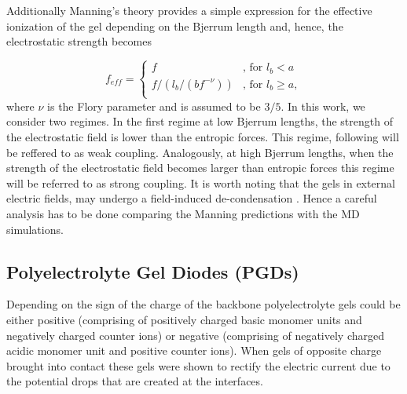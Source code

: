 \documentclass[twoside,twocolumn,9pt]{article}
\begin{document}
Additionally Manning's theory provides a simple expression for the effective ionization of the gel depending on the Bjerrum length and, hence, the electrostatic strength \cite{Mann2005} becomes 

\begin{equation}\label{eq:mann_explain}
  f_{eff} =
  \begin{cases}
    f & \text{, for $l_b<a$} \\
    f/(l_b/(b f^{-\nu})) & \text{, for $l_b \geq a$}, \\
  \end{cases}
\end{equation}
where $\nu$ is the Flory parameter and is assumed to be $3/5$. In this work, we consider two regimes.  In the first regime at low Bjerrum lengths, the strength of the electrostatic field is lower than the entropic forces. This regime, following \citep{Erbas2015} will be reffered to as weak coupling. Analogously, at high Bjerrum lengths, when the strength of the electrostatic field becomes larger than entropic forces this regime will be referred to as strong coupling. It is worth noting that the gels in external electric fields, may undergo a field-induced de-condensation \citep{Erbas2015}. Hence a careful analysis  has to be done comparing the Manning predictions with the MD simulations.


\subsection{Polyelectrolyte Gel Diodes (PGDs)}

Depending on the sign of the charge of the backbone polyelectrolyte gels could be either positive (comprising of positively charged basic monomer units and negatively charged counter ions) or negative (comprising of negatively charged acidic monomer unit and positive counter ions). When gels of opposite charge brought into contact these gels were shown to rectify the electric current due to the potential drops that are created at the interfaces.
\end{document}
